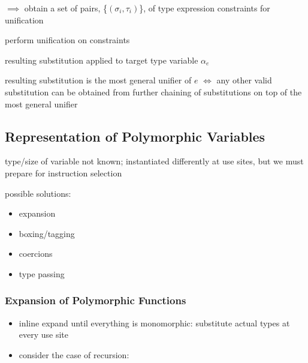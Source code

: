 \documentclass[8pt]{extarticle}
\begin{document}
\begin{multicols*}{2}
  $\implies$ obtain a set of pairs, \{$(\sigma_i, \tau_i)$\}, of type expression constraints for unification

  perform unification on constraints

  resulting substitution applied to target type variable $\alpha_e$

  resulting substitution is the most general unifier of $e$ $\iff$ any other valid substitution can be obtained from further chaining of substitutions on top of the most general unifier

  \subsection{Representation of Polymorphic Variables}

  type/size of variable not known; instantiated differently at use sites, but we must prepare for instruction selection

  possible solutions:
  \begin{itemize}
  \item expansion
  \item boxing/tagging
  \item coercions
  \item type passing
  \end{itemize}
  
  \subsubsection{Expansion of Polymorphic Functions}
  \begin{itemize}
  \item inline expand until everything is monomorphic: substitute actual types at every use site
  \item consider the case of recursion:
  \end{itemize}


\end{multicols*}
\end{document}
